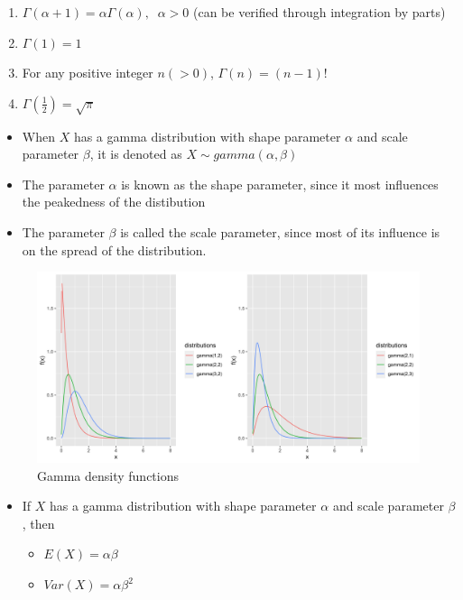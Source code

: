 \documentclass[]{book}
\providecommand{\tightlist}{%
  \setlength{\itemsep}{0pt}\setlength{\parskip}{0pt}}
\begin{document}
\begin{enumerate}
\def\labelenumi{\arabic{enumi}.}
\tightlist
\item
  \(\Gamma(\alpha+1)=\alpha\Gamma(\alpha),\;\; \alpha >0\) (can be verified through integration by parts)
\item
  \(\Gamma(1) =1\)
\item
  For any positive integer \(n(>0)\), \(\Gamma(n)=(n-1)!\)
\item
  \(\Gamma \left (\frac{1}{2} \right) = \sqrt{\pi}\)
\end{enumerate}

\begin{itemize}
\item
  When \(X\) has a gamma distribution with shape parameter \(\alpha\) and scale parameter \(\beta\), it is denoted as \(X \sim gamma(\alpha, \beta)\)
\item
  The parameter \(\alpha\) is known as the shape parameter, since it most influences the peakedness of the distibution
\item
  The parameter \(\beta\) is called the scale parameter, since most of its influence is on the spread of the distribution.
\end{itemize}

\begin{figure}

{\centering \includegraphics{figure/gamma-1} 

}

\caption{Gamma density functions}\label{fig:gamma}
\end{figure}

\begin{itemize}
\item
  If \(X\) has a gamma distribution with shape parameter \(\alpha\) and scale parameter \(\beta\), then

  \begin{itemize}
  \tightlist
  \item
    \(E(X) = \alpha \beta\)
  \item
    \(Var(X) = \alpha \beta^2\)
  \end{itemize}
\end{itemize}
\end{document}
